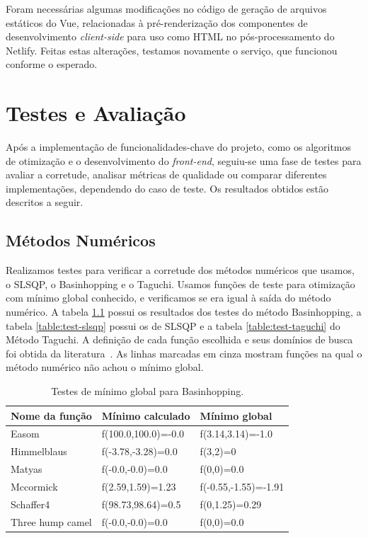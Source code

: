 \documentclass[]{politex}
\begin{document}
Foram necessárias algumas modificações no código de geração de arquivos
estáticos do Vue, relacionadas à pré-renderização dos componentes de
desenvolvimento \textit{client-side} para uso como HTML no pós-processamento do
Netlify. Feitas estas alterações, testamos novamente o serviço, que funcionou
conforme o esperado.

\chapter{Testes e Avaliação}

Após a implementação de funcionalidades-chave do projeto, como os algoritmos de
otimização e o desenvolvimento do \textit{front-end}, seguiu-se uma fase de
testes para avaliar a corretude, analisar métricas de qualidade ou comparar
diferentes implementações, dependendo do caso de teste. Os resultados obtidos
estão descritos a seguir.

\section{Métodos Numéricos}

Realizamos testes para verificar a corretude dos métodos numéricos que usamos, o
SLSQP, o Basinhopping e o Taguchi. Usamos funções de teste para otimização com
mínimo global conhecido, e verificamos se era igual à saída do método numérico.
A tabela \ref{table:test-bh} possui os resultados dos testes do método
Basinhopping, a tabela \ref{table:test-slsqp} possui os de SLSQP e a tabela
\ref{table:test-taguchi} do Método Taguchi. A definição de cada função escolhida
e seus domínios de busca foi obtida da literatura~\cite{optimization-functions}.
As linhas marcadas em cinza mostram funções na qual o método numérico não achou
o mínimo global.

\begin{table}[H]
\centering
\begin{tabular}{l|l|l}
 Nome da função & Mínimo calculado & Mínimo global \\ \hline
\rowcolor{Gray}
Easom  &  f(100.0,100.0)=-0.0  &  f(3.14,3.14)=-1.0 \\
Himmelblaus  &  f(-3.78,-3.28)=0.0  &  f(3,2)=0 \\
Matyas  &  f(-0.0,-0.0)=0.0  &  f(0,0)=0.0 \\
\rowcolor{Gray}
Mccormick  &  f(2.59,1.59)=1.23  &  f(-0.55,-1.55)=-1.91 \\
\rowcolor{Gray}
Schaffer4  &  f(98.73,98.64)=0.5  &  f(0,1.25)=0.29 \\
Three hump camel  &  f(-0.0,-0.0)=0.0  &  f(0,0)=0.0 \\
\end{tabular}
\caption{Testes de mínimo global para Basinhopping.}
\label{table:test-bh}
\end{table}
\end{document}
